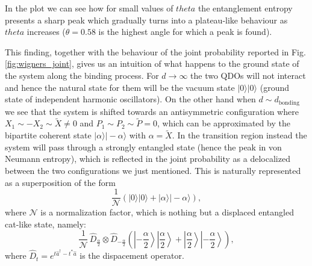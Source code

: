 \documentclass[reprint, amsmath, amssymb, floatfix, aps, pra]{revtex4-2}
\newcommand{\ket}[1]{|#1\rangle}
\begin{document}
    In the plot we can see how for small values of $theta$ the entanglement entropy presents a sharp peak which gradually turns into a plateau-like behaviour as $theta$ increases ($\theta = 0.58$ is the highest angle for which a peak is found).

    This finding, together with the behaviour of the joint probability reported in Fig. \ref{fig:wigners_joint}, gives us an intuition of what happens to the ground state of the system along the binding process. For $d\rightarrow \infty$ the two QDOs will not interact and hence the natural state for them will be the vacuum state $\ket{0}\ket{0}$ (ground state of independent harmonic oscillators). On the other hand when $d \sim d_{\mathrm{bonding}}$ we see that the system is shifted towards an antisymmetric configuration where $X_1 \sim -X_2 \sim \tilde{X} \neq 0$ and $P_1 \sim P_2 \sim \tilde{P} = 0$, which can be approximated by the bipartite coherent state $\ket{\alpha}\ket{-\alpha}$ with $\alpha = \tilde{X}$. In the transition region instead the system will pass through a strongly entangled state (hence the peak in von Neumann entropy), which is reflected in the joint probability as a delocalized between the two configurations we just mentioned. This is naturally represented as a superposition of the form
    \begin{equation}
        \frac{1}{\mathcal{N}}\left(\ket{0}\ket{0} + \ket{\alpha}\ket{-\alpha}\right),
    \end{equation}
    where $\mathcal{N}$ is a normalization factor, which is nothing but a displaced entangled cat-like state, namely:
    \begin{equation}
        \frac{1}{\mathcal{N}}\,\hat{D}_{\frac{\alpha}{2}}\otimes\hat{D}_{-\frac{\alpha}{2}}\left(\left|-\frac{\alpha}{2}\right\rangle\left|\frac{\alpha}{2}\right\rangle + \left|\frac{\alpha}{2}\right\rangle\left|-\frac{\alpha}{2}\right\rangle\right),
    \end{equation}
    where $\hat{D}_{t} = e^{t\hat{a}^{\dagger} - t^{*}\hat{a}}$ is the dispacement operator.
\end{document}
